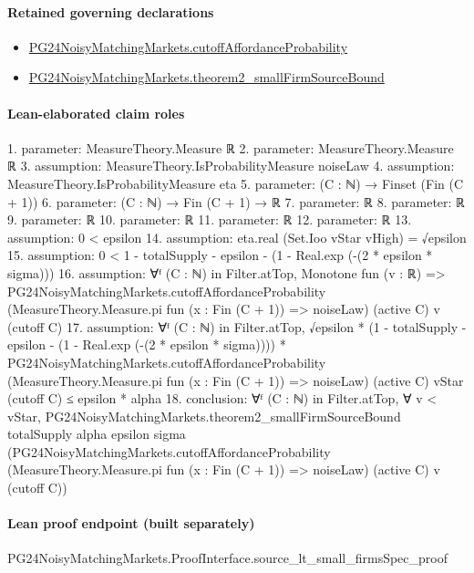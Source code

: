 \documentclass[10pt]{article}
\begin{document}
\paragraph{Retained governing declarations}
\begin{itemize}\raggedright
\item \hyperlink{governing-declaration-a4a2a08d89f647e4}{PG24\allowbreak{}Noisy\allowbreak{}Matching\allowbreak{}Markets.\allowbreak{}cutoff\allowbreak{}Affordance\allowbreak{}Probability}
\item \hyperlink{governing-declaration-a0f67aac352175a7}{PG24\allowbreak{}Noisy\allowbreak{}Matching\allowbreak{}Markets.\allowbreak{}theorem2\_\allowbreak{}small\allowbreak{}Firm\allowbreak{}Source\allowbreak{}Bound}
\end{itemize}
\paragraph{Lean-elaborated claim roles}\begin{ReviewVerbatim}
1. parameter: MeasureTheory.Measure ℝ
2. parameter: MeasureTheory.Measure ℝ
3. assumption: MeasureTheory.IsProbabilityMeasure noiseLaw
4. assumption: MeasureTheory.IsProbabilityMeasure eta
5. parameter: (C : ℕ) → Finset (Fin (C + 1))
6. parameter: (C : ℕ) → Fin (C + 1) → ℝ
7. parameter: ℝ
8. parameter: ℝ
9. parameter: ℝ
10. parameter: ℝ
11. parameter: ℝ
12. parameter: ℝ
13. assumption: 0 < epsilon
14. assumption: eta.real (Set.Ioo vStar vHigh) = √epsilon
15. assumption: 0 < 1 - totalSupply - epsilon - (1 - Real.exp (-(2 * epsilon * sigma)))
16. assumption: ∀ᶠ (C : ℕ) in Filter.atTop,
  Monotone fun (v : ℝ) =>
    PG24NoisyMatchingMarkets.cutoffAffordanceProbability (MeasureTheory.Measure.pi fun (x : Fin (C + 1)) => noiseLaw)
      (active C) v (cutoff C)
17. assumption: ∀ᶠ (C : ℕ) in Filter.atTop,
  √epsilon * (1 - totalSupply - epsilon - (1 - Real.exp (-(2 * epsilon * sigma)))) *
      PG24NoisyMatchingMarkets.cutoffAffordanceProbability (MeasureTheory.Measure.pi fun (x : Fin (C + 1)) => noiseLaw)
        (active C) vStar (cutoff C) ≤
    epsilon * alpha
18. conclusion: ∀ᶠ (C : ℕ) in Filter.atTop,
  ∀ v < vStar,
    PG24NoisyMatchingMarkets.theorem2_smallFirmSourceBound totalSupply alpha epsilon sigma
      (PG24NoisyMatchingMarkets.cutoffAffordanceProbability (MeasureTheory.Measure.pi fun (x : Fin (C + 1)) => noiseLaw)
        (active C) v (cutoff C))
\end{ReviewVerbatim}

\paragraph{Lean proof endpoint (built separately)}\begin{ReviewVerbatim}
PG24NoisyMatchingMarkets.ProofInterface.source_lt_small_firmsSpec_proof
\end{ReviewVerbatim}
\end{document}
